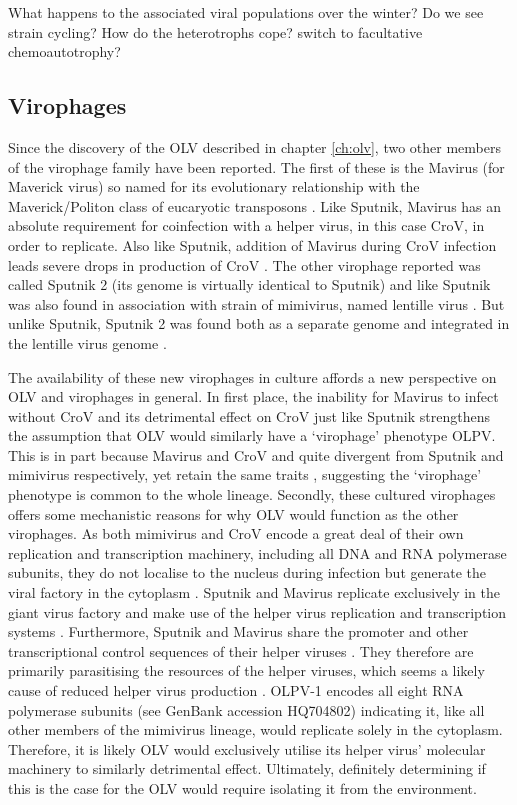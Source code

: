 What happens to the associated viral populations over the winter?
Do we see strain cycling?
How do the heterotrophs cope? switch to facultative chemoautotrophy?

\subsection{Virophages}
Since the discovery of the \ac{OLV} described in chapter \ref{ch:olv}, two other members of the virophage family have been reported.
The first of these is the Mavirus (for Maverick virus) so named for its evolutionary relationship with the Maverick/Politon class of eucaryotic transposons \cite{Fischer2011}.
Like Sputnik, Mavirus has an absolute requirement for coinfection with a helper virus, in this case \ac{CroV}, in order to replicate.
Also like Sputnik, addition of Mavirus during \ac{CroV} infection leads severe drops in production of \ac{CroV} \cite{Fischer2011}.
The other virophage reported was called Sputnik 2 (its genome is virtually identical to Sputnik) and like Sputnik was also found in association with strain of mimivirus, named lentille virus \cite{Desnues2012}.
But unlike Sputnik, Sputnik 2 was found both as a separate genome and integrated in the lentille virus genome \cite{Desnues2012}.

The availability of these new virophages in culture affords a new perspective on \ac{OLV} and virophages in general.
In first place, the inability for Mavirus to infect without \ac{CroV} and its detrimental effect on \ac{CroV} just like Sputnik strengthens the assumption that OLV would similarly have a `virophage' phenotype \ac{OLPV}.
This is in part because Mavirus and \ac{CroV} and quite divergent from Sputnik and mimivirus respectively, yet retain the same traits \cite{Fischer2010, Fischer2011}, suggesting the `virophage' phenotype is common to the whole lineage.
Secondly, these cultured virophages offers some mechanistic reasons for why \ac{OLV} would function as the other virophages.
As both mimivirus and \ac{CroV} encode a great deal of their own replication and transcription machinery, including all \textsc{DNA} and \textsc{RNA} polymerase subunits, they do not localise to the nucleus during infection but generate the viral factory in the cytoplasm \cite{LaScola2008, Fischer2011}.
Sputnik and Mavirus replicate exclusively in the giant virus factory and make use of the helper virus replication and transcription systems \cite{LaScola2008, Fischer2011}.
Furthermore, Sputnik and Mavirus share the promoter and other transcriptional control sequences of their helper viruses \cite{Claverie2009, Fischer2011}.
They therefore are primarily parasitising the resources of the helper viruses, which seems a likely cause of reduced helper virus production \cite{Claverie2009, Fischer2011}.
\ac{OLPV}-1 encodes all eight \textsc{RNA} polymerase subunits (see GenBank accession HQ704802) indicating it, like all other members of the mimivirus lineage, would replicate solely in the cytoplasm.
Therefore, it is likely \ac{OLV} would exclusively utilise its helper virus' molecular machinery to similarly detrimental effect.
Ultimately, definitely determining if this is the case for the \ac{OLV} would require isolating it from the environment.

